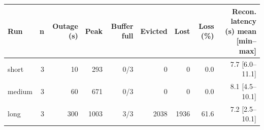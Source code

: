 \begin{tabular}{lrrrrrrrr}
\toprule
Run & n & Outage (s) & Peak & Buffer full & Evicted & Lost & Loss (\%) & Recon. latency (s) mean [min--max]\\
\midrule
short & 3 & 10 & 293 & 0/3 & 0 & 0 & 0.0 & 7.7 [6.0--11.1]\\
medium & 3 & 60 & 671 & 0/3 & 0 & 0 & 0.0 & 8.1 [4.5--10.1]\\
long & 3 & 300 & 1003 & 3/3 & 2038 & 1936 & 61.6 & 7.2 [2.5--10.1]\\
\bottomrule
\end{tabular}